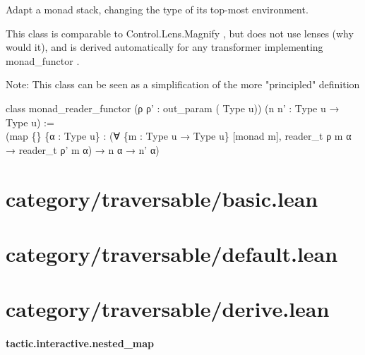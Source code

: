 \documentclass{article}
\begin{document}
\par
Adapt a monad stack, changing the type of its top-most environment.
\par
This class is comparable to 
\href{https://hackage.haskell.org/package/lens-4.15.4/docs/Control-Lens-Zoom.html#t:Magnify}{}Control.Lens.Magnify
, but does not use lenses (why would it), and is derived automatically for any transformer implementing 
\colorbox[RGB]{253,246,227}{{{{\color[RGB]{101, 123, 131} monad\_functor }}}}.
\par
Note: This class can be seen as a simplification of the more "principled" definition
\\
\colorbox[RGB]{253,246,227}{\parbox{4.5in}{{{{\color[RGB]{133, 153, 0} class }}}{{{\color[RGB]{101, 123, 131}   }}}{{{\color[RGB]{211, 54, 130} monad\_reader\_functor }}}{{{\color[RGB]{101, 123, 131}   }}}{{{\color[RGB]{101, 123, 131} (ρ ρ' : out\_param ( }}}{{{\color[RGB]{38, 139, 210} Type }}}{{{\color[RGB]{101, 123, 131}  u)) (n n' :  }}}{{{\color[RGB]{38, 139, 210} Type }}}{{{\color[RGB]{101, 123, 131}  u  }}}{{{\color[RGB]{133, 153, 0} → }}}{{{\color[RGB]{101, 123, 131}   }}}{{{\color[RGB]{38, 139, 210} Type }}}{{{\color[RGB]{101, 123, 131}  u)  }}}{{{\color[RGB]{181, 137, 0} := }}}{{{\color[RGB]{101, 123, 131} 
 }}}\\

{{{\color[RGB]{101, 123, 131} (map \{\} \{α :  }}}{{{\color[RGB]{38, 139, 210} Type }}}{{{\color[RGB]{101, 123, 131}  u\} : (∀ \{m :  }}}{{{\color[RGB]{38, 139, 210} Type }}}{{{\color[RGB]{101, 123, 131}  u  }}}{{{\color[RGB]{133, 153, 0} → }}}{{{\color[RGB]{101, 123, 131}   }}}{{{\color[RGB]{38, 139, 210} Type }}}{{{\color[RGB]{101, 123, 131}  u\} {[}monad m{]}, reader\_t ρ m α  }}}{{{\color[RGB]{133, 153, 0} → }}}{{{\color[RGB]{101, 123, 131}  reader\_t ρ' m α)  }}}{{{\color[RGB]{133, 153, 0} → }}}{{{\color[RGB]{101, 123, 131}  n α  }}}{{{\color[RGB]{133, 153, 0} → }}}{{{\color[RGB]{101, 123, 131}  n' α)
 }}}\\

}}\section{category/traversable/basic.lean}\section{category/traversable/default.lean}\section{category/traversable/derive.lean}\paragraph{tactic.interactive.nested\_map}
\end{document}
